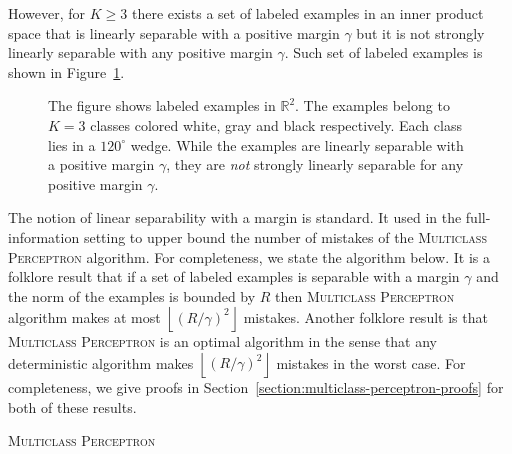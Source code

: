 \documentclass[12pt]{article}
\newcommand{\R}{\mathbb{R}}  %
\newcommand{\ip}[2]{\left\langle #1, #2 \right\rangle} %
\DeclareMathOperator*{\argmax}{argmax}
\begin{document}
However, for $K \ge 3$ there exists a set of labeled examples in an inner product
space that is linearly separable with a positive margin $\gamma$ but it is not
strongly linearly separable with any positive margin $\gamma$. Such set of labeled
examples is shown in
Figure~\ref{figure:linearly-separable-examples-with-margin}.

\begin{figure}
\begin{center}

\end{center}
\caption{The figure shows labeled examples in $\R^2$. The examples belong to
$K=3$ classes colored white, gray and black respectively. Each class lies in a
$120^\circ$ wedge. While the examples are linearly separable with a positive
margin $\gamma$, they are \emph{not} strongly linearly separable for any
positive margin $\gamma$.
}
\label{figure:linearly-separable-examples-with-margin}
\end{figure}

The notion of linear separability with a margin is standard. It used in the
full-information setting to upper bound the number of mistakes of the
\textsc{Multiclass Perceptron} algorithm. For completeness, we state the
algorithm below. It is a folklore result that if a set of labeled examples is
separable with a margin $\gamma$ and the norm of the examples is bounded by $R$
then \textsc{Multiclass Perceptron} algorithm makes at most $\left\lfloor
(R/\gamma)^2 \right \rfloor$ mistakes. Another folklore result is that
\textsc{Multiclass Perceptron} is an optimal algorithm in the sense that any
deterministic algorithm makes $\left\lfloor (R/\gamma)^2 \right \rfloor$
mistakes in the worst case. For completeness, we give proofs  in
Section~\ref{section:multiclass-perceptron-proofs} for both of these results.

\begin{algorithm}[h]
\caption{\textsc{Multiclass Perceptron}
\label{algorithm:mutliclass-perceptron}}
\begin{algorithmic}[1]
{
\STATE{Predict $\widehat y_t = \argmax_{i \in \{1,2,\dots,K\}} \ip{w_t^{(i)}}{x_t}$}
\ELSE
{}
\ENDIF
\ENDFOR
}
\end{algorithmic}
\end{algorithm}
\end{document}
